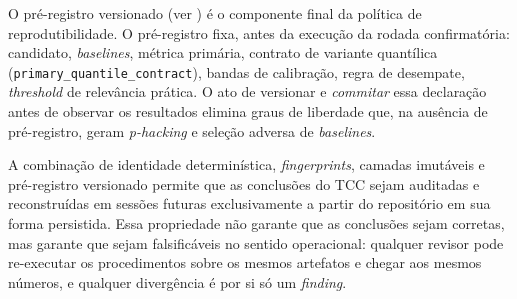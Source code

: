 O pré-registro versionado (ver ) é o componente final da política de reprodutibilidade. O pré-registro fixa, antes da execução da rodada confirmatória: candidato, \textit{baselines}, métrica primária, contrato de variante quantílica (\texttt{primary\_quantile\_contract}), bandas de calibração, regra de desempate, \textit{threshold} de relevância prática. O ato de versionar e \textit{commitar} essa declaração antes de observar os resultados elimina graus de liberdade que, na ausência de pré-registro, geram \textit{p-hacking} e seleção adversa de \textit{baselines}.

A combinação de identidade determinística, \textit{fingerprints}, camadas imutáveis e pré-registro versionado permite que as conclusões do TCC sejam auditadas e reconstruídas em sessões futuras exclusivamente a partir do repositório em sua forma persistida. Essa propriedade não garante que as conclusões sejam corretas, mas garante que sejam falsificáveis no sentido operacional: qualquer revisor pode re-executar os procedimentos sobre os mesmos artefatos e chegar aos mesmos números, e qualquer divergência é por si só um \textit{finding}.

